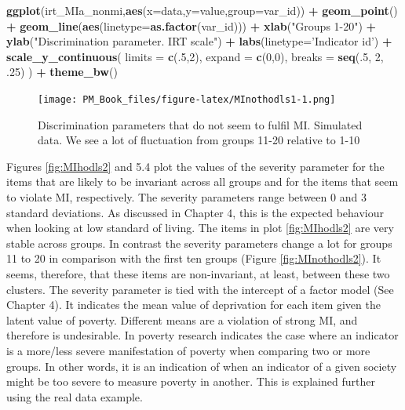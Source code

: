 \documentclass[]{book}
\newenvironment{Shaded}{\begin{snugshade}}{\end{snugshade}}
\newcommand{\DataTypeTok}[1]{\textcolor[rgb]{0.13,0.29,0.53}{#1}}
\newcommand{\DecValTok}[1]{\textcolor[rgb]{0.00,0.00,0.81}{#1}}
\newcommand{\FloatTok}[1]{\textcolor[rgb]{0.00,0.00,0.81}{#1}}
\newcommand{\KeywordTok}[1]{\textcolor[rgb]{0.13,0.29,0.53}{\textbf{#1}}}
\newcommand{\NormalTok}[1]{#1}
\newcommand{\OperatorTok}[1]{\textcolor[rgb]{0.81,0.36,0.00}{\textbf{#1}}}
\newcommand{\StringTok}[1]{\textcolor[rgb]{0.31,0.60,0.02}{#1}}
\begin{document}
\begin{Shaded}
\begin{Highlighting}[]
\KeywordTok{ggplot}\NormalTok{(irt_MIa_nonmi,}\KeywordTok{aes}\NormalTok{(}\DataTypeTok{x=}\NormalTok{data,}\DataTypeTok{y=}\NormalTok{value,}\DataTypeTok{group=}\NormalTok{var_id)) }\OperatorTok{+}\StringTok{ }\KeywordTok{geom_point}\NormalTok{()  }\OperatorTok{+}\StringTok{ }
\StringTok{  }\KeywordTok{geom_line}\NormalTok{(}\KeywordTok{aes}\NormalTok{(}\DataTypeTok{linetype=}\KeywordTok{as.factor}\NormalTok{(var_id))) }\OperatorTok{+}\StringTok{ }
\StringTok{  }\KeywordTok{xlab}\NormalTok{(}\StringTok{"Groups 1-20"}\NormalTok{) }\OperatorTok{+}\StringTok{ }\KeywordTok{ylab}\NormalTok{(}\StringTok{"Discrimination parameter. IRT scale"}\NormalTok{) }\OperatorTok{+}\StringTok{ }
\StringTok{  }\KeywordTok{labs}\NormalTok{(}\DataTypeTok{linetype=}\StringTok{'Indicator id'}\NormalTok{) }\OperatorTok{+}\StringTok{  }
\StringTok{  }\KeywordTok{scale_y_continuous}\NormalTok{( }\DataTypeTok{limits =} \KeywordTok{c}\NormalTok{(.}\DecValTok{5}\NormalTok{,}\DecValTok{2}\NormalTok{), }\DataTypeTok{expand =} \KeywordTok{c}\NormalTok{(}\DecValTok{0}\NormalTok{,}\DecValTok{0}\NormalTok{), }\DataTypeTok{breaks =} \KeywordTok{seq}\NormalTok{(.}\DecValTok{5}\NormalTok{, }\DecValTok{2}\NormalTok{, }\FloatTok{.25}\NormalTok{) ) }\OperatorTok{+}\StringTok{ }
\StringTok{  }\KeywordTok{theme_bw}\NormalTok{() }
\end{Highlighting}
\end{Shaded}

\begin{figure}
\centering
\texttt{[image: PM\_Book\_files/figure-latex/MInothodls1-1.png]}
\caption{\label{fig:MInothodls1}Discrimination parameters that do not seem to fulfil MI. Simulated data. We see a lot of fluctuation from groups 11-20 relative to 1-10}
\end{figure}

Figures \ref{fig:MIhodls2} and 5.4 plot the values of the severity parameter for the items that are likely to be invariant across all groups and for the items that seem to violate MI, respectively. The severity parameters range between 0 and 3 standard deviations. As discussed in Chapter 4, this is the expected behaviour when looking at low standard of living. The items in plot \ref{fig:MIhodls2} are very stable across groups. In contrast the severity parameters change a lot for groups 11 to 20 in comparison with the first ten groups (Figure \ref{fig:MInothodls2}). It seems, therefore, that these items are non-invariant, at least, between these two clusters. The severity parameter is tied with the intercept of a factor model (See Chapter 4). It indicates the mean value of deprivation for each item given the latent value of poverty. Different means are a violation of strong MI, and therefore is undesirable. In poverty research indicates the case where an indicator is a more/less severe manifestation of poverty when comparing two or more groups. In other words, it is an indication of when an indicator of a given society might be too severe to measure poverty in another. This is explained further using the real data example.
\end{document}
